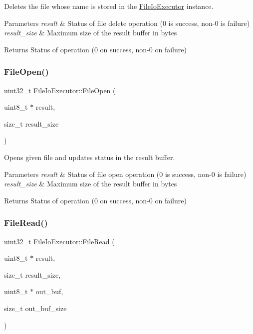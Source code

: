 Deletes the file whose name is stored in the \hyperlink{classFileIoExecutor}{File\+Io\+Executor} instance.


\begin{DoxyParams}{Parameters}
{\em result} & Status of file delete operation (0 is success, non-\/0 is failure) \\
\hline
{\em result\+\_\+size} & Maximum size of the result buffer in bytes \\
\hline
\end{DoxyParams}
\begin{DoxyReturn}{Returns}
Status of operation (0 on success, non-\/0 on failure) 
\end{DoxyReturn}
\mbox{\label{classFileIoExecutor_a36cbe68b508f084de8f76a88797ce670}} 
\subsubsection{\texorpdfstring{File\+Open()}{FileOpen()}}
{\footnotesize\ttfamily uint32\+\_\+t File\+Io\+Executor\+::\+File\+Open (\begin{DoxyParamCaption}\item[{uint8\+\_\+t $\ast$}]{result,  }\item[{size\+\_\+t}]{result\+\_\+size }\end{DoxyParamCaption})}

Opens given file and updates status in the result buffer.


\begin{DoxyParams}{Parameters}
{\em result} & Status of file open operation (0 is success, non-\/0 is failure) \\
\hline
{\em result\+\_\+size} & Maximum size of the result buffer in bytes \\
\hline
\end{DoxyParams}
\begin{DoxyReturn}{Returns}
Status of operation (0 on success, non-\/0 on failure) 
\end{DoxyReturn}
\mbox{\label{classFileIoExecutor_ab0b3510df933d83fff527ad3385e6c35}} 
\subsubsection{\texorpdfstring{File\+Read()}{FileRead()}}
{\footnotesize\ttfamily uint32\+\_\+t File\+Io\+Executor\+::\+File\+Read (\begin{DoxyParamCaption}\item[{uint8\+\_\+t $\ast$}]{result,  }\item[{size\+\_\+t}]{result\+\_\+size,  }\item[{uint8\+\_\+t $\ast$}]{out\+\_\+buf,  }\item[{size\+\_\+t}]{out\+\_\+buf\+\_\+size }\end{DoxyParamCaption})}


